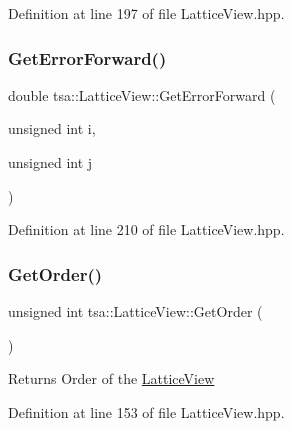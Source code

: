 Definition at line 197 of file Lattice\+View.\+hpp.

\mbox{\label{classtsa_1_1_lattice_view_ac9a4c9e01891d9c7c2ba5139c23ac86e}} 
\subsubsection{\texorpdfstring{Get\+Error\+Forward()}{GetErrorForward()}\hspace{0.1cm}{\footnotesize\ttfamily [2/2]}}
{\footnotesize\ttfamily double tsa\+::\+Lattice\+View\+::\+Get\+Error\+Forward (\begin{DoxyParamCaption}\item[{unsigned int}]{i,  }\item[{unsigned int}]{j }\end{DoxyParamCaption})\hspace{0.3cm}{\ttfamily [inline]}}



Definition at line 210 of file Lattice\+View.\+hpp.

\mbox{\label{classtsa_1_1_lattice_view_a9aedf999a2129ae0b000ba6caded4b6b}} 
\subsubsection{\texorpdfstring{Get\+Order()}{GetOrder()}}
{\footnotesize\ttfamily unsigned int tsa\+::\+Lattice\+View\+::\+Get\+Order (\begin{DoxyParamCaption}{ }\end{DoxyParamCaption})\hspace{0.3cm}{\ttfamily [inline]}}

\begin{DoxyReturn}{Returns}
Order of the \hyperlink{classtsa_1_1_lattice_view}{Lattice\+View} 
\end{DoxyReturn}


Definition at line 153 of file Lattice\+View.\+hpp.

\mbox{\label{classtsa_1_1_lattice_view_a0549c29576047fa4e0c4871a23904951}} 
